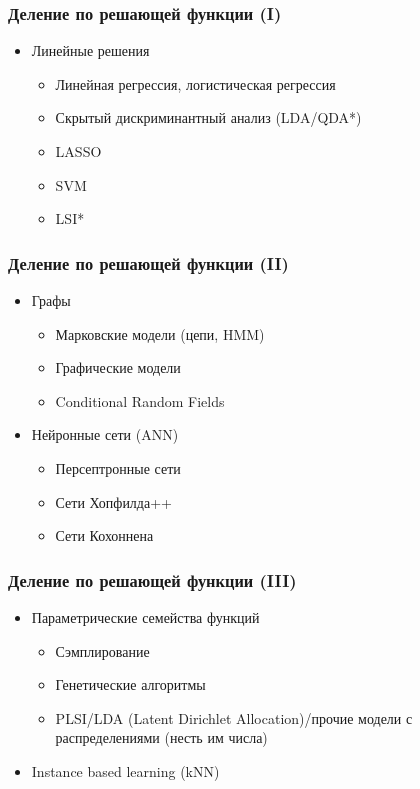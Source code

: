\documentclass[14pt, fleqn, xcolor={dvipsnames, table}]{beamer}
\begin{document}
\begin{frame}
\frametitle{Деление по решающей функции (I)}
\begin{itemize}
\item Линейные решения 
	\begin{itemize}
	\item Линейная регрессия, логистическая регрессия
	\item Скрытый дискриминантный анализ (LDA/QDA*)
	\item LASSO
	\item SVM
	\item LSI*
	\end{itemize}
\end{itemize}
\end{frame}

\begin{frame}
\frametitle{Деление по решающей функции (II)}
\begin{itemize}
\item Графы
\begin{itemize}
	\item Марковские модели (цепи, HMM)
	\item Графические модели
	\item Conditional Random Fields
\end{itemize}
\item Нейронные сети (ANN)
\begin{itemize}
	\item Персептронные сети
	\item Сети Хопфилда++
	\item Сети Кохоннена
\end{itemize}
\end{itemize}
\end{frame}

\begin{frame}
\frametitle{Деление по решающей функции (III)}
\begin{itemize}
\item Параметрические семейства функций
	\begin{itemize}
		\item Сэмплирование
		\item Генетические алгоритмы
		\item PLSI/LDA (Latent Dirichlet Allocation)/прочие модели с распределениями (несть им числа)
	\end{itemize}
\item Instance based learning (kNN)
\end{itemize}
\end{frame}
\end{document}
